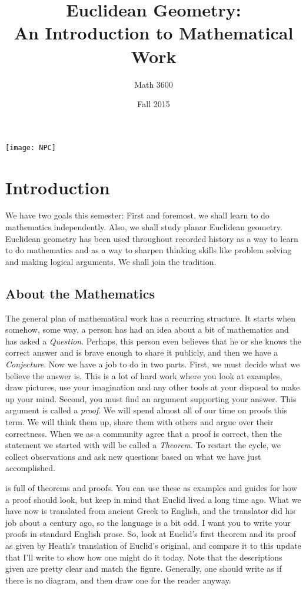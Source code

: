 \documentclass{tufte-handout}
\title{Euclidean Geometry:\\An Introduction to Mathematical Work}
\author[Math 3600]{Math 3600}
\date{Fall 2015}
\theoremstyle{definition}
\begin{document}
\maketitle

\begin{marginfigure}
    \texttt{[image: NPC]}
\end{marginfigure}


\section*{Introduction}

We have two goals this semester:
First and foremost, we shall learn to do mathematics independently.
Also, we shall study planar Euclidean geometry.
Euclidean geometry has been used throughout recorded history as a way to learn to do mathematics and as a way to sharpen thinking skills like problem solving and making logical arguments.
We shall join the tradition.

\subsection*{About the Mathematics}
The general plan of mathematical work has a recurring structure.
It starts when somehow, some way, a person has had an idea about a bit of mathematics and has asked a \emph{Question}.
Perhaps, this person even believes that he or she knows the correct answer and is brave enough to share it publicly, and then we have a \emph{Conjecture}.
Now we have a job to do in two parts.
First, we must decide what we believe the answer is.
This is a lot of hard work where you look at examples, draw pictures, use your imagination and any other tools at your disposal to make up your mind.
Second, you must find an argument supporting your answer.
This argument is called a \emph{proof}.
We will spend almost all of our time on proofs this term. We will think them up, share them with others and argue over their correctness.
When we as a community agree that a proof is correct, then the statement we started with will be called a \emph{Theorem}.
To restart the cycle, we collect observations and ask new questions based on what we have just accomplished.

 is full of theorems and proofs.
 You can use these as examples and guides for how a proof should look, but keep in mind that Euclid lived a long time ago.
 What we have now is translated from ancient Greek to English, and the translator did his job about a century ago, so the language is a bit odd.
I want you to write your proofs in standard English prose.
So, look at Euclid's first theorem and its proof as given by Heath's translation of Euclid's original, and compare it to this update that I'll write to show how one might do it today.
Note that the descriptions given are pretty clear and match the figure.
Generally, one should write as if there is no diagram, and then draw one for the reader anyway.
\end{document}
